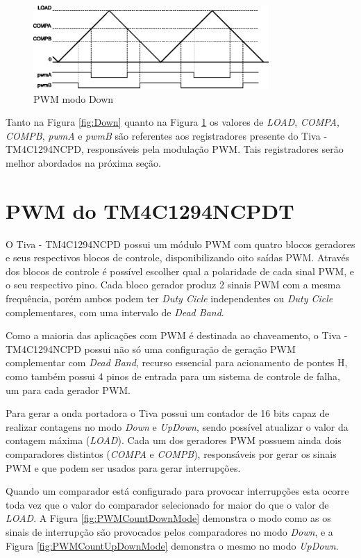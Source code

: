 \begin{figure}[H]
	\centering
	\includegraphics[width=0.8\textwidth] {figuras/UpDown.eps}
	\caption{PWM modo Down \cite{DATASHEET_TIVA}}
	\label{fig:UpDown}
\end{figure}

Tanto na Figura \ref{fig:Down} quanto na Figura \ref{fig:UpDown} os valores de \emph{LOAD}, \emph{COMPA}, \emph{COMPB}, \emph{pwmA} e \emph{pwmB} são referentes aos registradores presente do Tiva - TM4C1294NCPD, responsáveis pela modulação PWM. Tais registradores serão melhor abordados na próxima seção.  

\section{PWM do TM4C1294NCPDT}

O Tiva - TM4C1294NCPD possui um módulo PWM com quatro blocos geradores e seus respectivos blocos de controle, disponibilizando oito saídas PWM.  Através dos blocos de controle é possível escolher qual a polaridade de cada sinal PWM, e o seu respectivo pino. Cada bloco gerador produz 2 sinais PWM com a mesma frequência, porém ambos podem ter \emph{Duty Cicle} independentes ou \emph{Duty Cicle} complementares, com uma intervalo de \emph{Dead Band}. 

Como a maioria das aplicações com PWM é destinada ao chaveamento, o Tiva - TM4C1294NCPD possui não só uma configuração de geração PWM complementar com \emph{Dead Band}, recurso essencial para acionamento de pontes H, como também possui 4 pinos de entrada para um sistema de controle de falha, um para cada gerador PWM.

Para gerar a onda portadora o Tiva possui um contador de 16 bits capaz de realizar contagens no modo \emph{Down} e \emph{UpDown}, sendo possível atualizar o valor da contagem máxima (\emph{LOAD}). Cada um dos geradores PWM possuem ainda dois comparadores distintos (\emph{COMPA} e \emph{COMPB}), responsáveis por gerar os sinais PWM e que podem ser usados para gerar interrupções. 

Quando um comparador está configurado para provocar interrupções esta ocorre toda vez que o valor do comparador selecionado for maior do que o valor de \emph{LOAD}.  A Figura \ref{fig:PWMCountDownMode} demonstra o modo como as os sinais de interrupção são provocados pelos comparadores no modo \emph{Down}, e a Figura \ref{fig:PWMCountUpDownMode} demonstra o mesmo no modo \emph{UpDown}.

